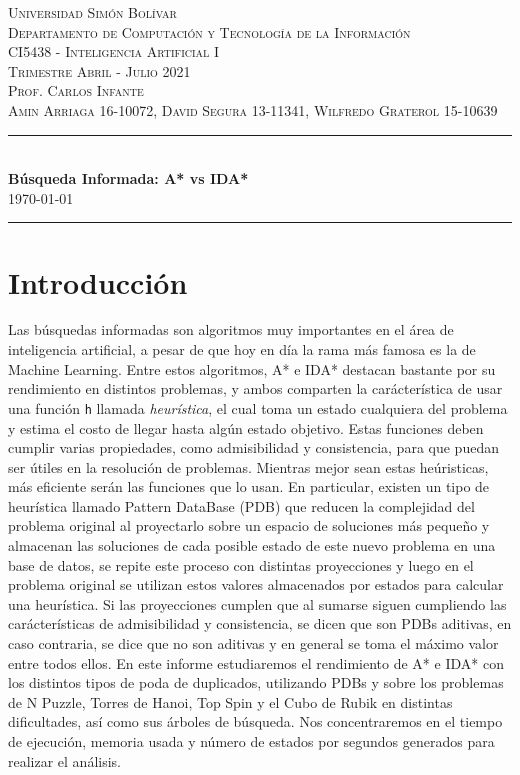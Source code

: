 \documentclass[a4paper,10pt]{article}
\date{}
\newcommand{\HRule}{\rule{\linewidth}{0.5mm}}
\begin{document}
\begin{center}
  \textsc {
    Universidad Simón Bolívar \\[0cm]
    Departamento de Computaci\'on y Tecnolog\'ia de la Informaci\'on \\[0cm]
    CI5438 - Inteligencia Artificial I \\[0cm]
    Trimestre Abril - Julio 2021 \\[0cm]
    Prof. Carlos Infante \\[0cm]
    Amin Arriaga 16-10072, David Segura 13-11341, Wilfredo Graterol 15-10639
  }
  \HRule \\[0.4cm]
  {\Large \textbf{B\'usqueda Informada: A* vs IDA*}} \\[0.4cm]
  \textsc{
    \today
  }
  \HRule
\end{center}

\section{Introducci\'on}
  Las b\'usquedas informadas son algoritmos muy importantes en el
  \'area de inteligencia artificial, a pesar de que hoy en d\'ia 
  la rama m\'as famosa es la de Machine Learning. Entre estos algoritmos,
  A* e IDA* destacan bastante por su rendimiento en distintos problemas, y 
  ambos comparten la car\'acter\'istica de usar una funci\'on \verb|h| llamada 
  \textit{heur\'istica}, el cual toma un estado cualquiera del problema
  y estima el costo de llegar hasta alg\'un estado objetivo. Estas funciones
  deben cumplir varias propiedades, como admisibilidad y consistencia, para
  que puedan ser \'utiles en la resoluci\'on de problemas. Mientras mejor
  sean estas he\'uristicas, m\'as eficiente ser\'an las funciones que lo usan.
  En particular, existen un tipo de heur\'istica llamado Pattern DataBase (PDB)
  que reducen la complejidad del problema original al proyectarlo sobre un 
  espacio de soluciones m\'as peque\~no y almacenan las soluciones de cada 
  posible estado de este nuevo problema en una base de datos, se repite este 
  proceso con distintas proyecciones y luego en el problema original se utilizan
  estos valores almacenados por estados para calcular una heur\'istica. Si las
  proyecciones cumplen que al sumarse siguen cumpliendo las car\'acter\'isticas
  de admisibilidad y consistencia, se dicen que son PDBs aditivas, en caso 
  contraria, se dice que no son aditivas y en general se toma el m\'aximo valor 
  entre todos ellos. En este informe estudiaremos el rendimiento de A* e IDA* con 
  los distintos tipos de poda de duplicados, utilizando PDBs y sobre los problemas
  de N Puzzle, Torres de Hanoi, Top Spin y el Cubo de Rubik en distintas
  dificultades, as\'i como sus \'arboles de b\'usqueda. Nos concentraremos
  en el tiempo de ejecuci\'on, memoria usada y n\'umero de estados por segundos
  generados para realizar el an\'alisis.
\end{document}
